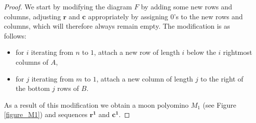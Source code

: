 \begin{proof}

We start by modifying the diagram $F$ by adding some new rows and columns, adjusting $\bm{r}$ and $\bm{c}$ appropriately by assigning
0's to the new rows and columns, which will therefore always remain empty. The modification is as follows:
\begin{itemize}
\item for $i$ iterating from $n$ to $1$, attach a new row of length $i$ below the $i$ rightmost columns of $A$,
\item for $j$ iterating from $m$ to $1$, attach a new column of length $j$ to the right of the bottom $j$ rows of $B$.
\end{itemize}
As a result of this modification we obtain a moon polyomino $M_1$ (see Figure \ref{figure_M1}) and sequences $\bm{r^1}$ and $\bm{c^1}$.


\end{proof}

